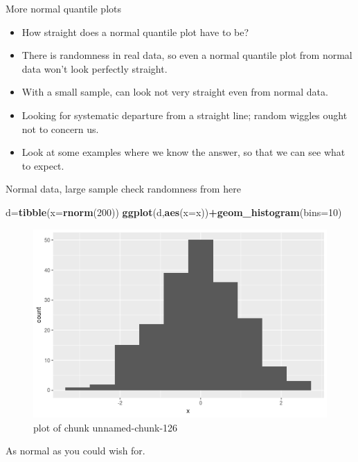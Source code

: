 \documentclass[ignorenonframetext,]{beamer}
\newenvironment{Shaded}{\begin{snugshade}}{\end{snugshade}}
\newcommand{\DataTypeTok}[1]{\textcolor[rgb]{0.13,0.29,0.53}{#1}}
\newcommand{\DecValTok}[1]{\textcolor[rgb]{0.00,0.00,0.81}{#1}}
\newcommand{\KeywordTok}[1]{\textcolor[rgb]{0.13,0.29,0.53}{\textbf{#1}}}
\newcommand{\NormalTok}[1]{#1}
\newcommand{\OperatorTok}[1]{\textcolor[rgb]{0.81,0.36,0.00}{\textbf{#1}}}
\providecommand{\tightlist}{%
  \setlength{\itemsep}{0pt}\setlength{\parskip}{0pt}}
\begin{document}
\begin{frame}{More normal quantile plots}
\protect\hypertarget{more-normal-quantile-plots}{}

\begin{itemize}
\tightlist
\item
  How straight does a normal quantile plot have to be?
\item
  There is randomness in real data, so even a normal quantile plot from
  normal data won't look perfectly straight.
\item
  With a small sample, can look not very straight even from normal data.
\item
  Looking for systematic departure from a straight line; random wiggles
  ought not to concern us.
\item
  Look at some examples where we know the answer, so that we can see
  what to expect.
\end{itemize}

\end{frame}

\begin{frame}[fragile]{Normal data, large sample check randomness from
here}
\protect\hypertarget{normal-data-large-sample-check-randomness-from-here}{}

\begin{Shaded}
\begin{Highlighting}[]
\NormalTok{d=}\KeywordTok{tibble}\NormalTok{(}\DataTypeTok{x=}\KeywordTok{rnorm}\NormalTok{(}\DecValTok{200}\NormalTok{))}
\KeywordTok{ggplot}\NormalTok{(d,}\KeywordTok{aes}\NormalTok{(}\DataTypeTok{x=}\NormalTok{x))}\OperatorTok{+}\KeywordTok{geom_histogram}\NormalTok{(}\DataTypeTok{bins=}\DecValTok{10}\NormalTok{)}
\end{Highlighting}
\end{Shaded}

\begin{figure}
\centering
\includegraphics{figure/unnamed-chunk-126-1.png}
\caption{plot of chunk unnamed-chunk-126}
\end{figure}

As normal as you could wish for.

\end{frame}
\end{document}
